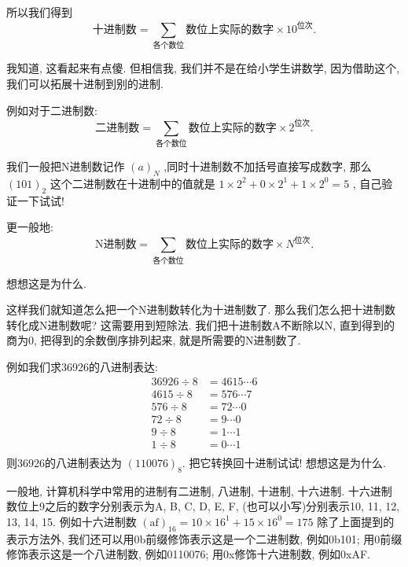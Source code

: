         所以我们得到
            \[ \mbox{十进制数} = \sum _ {\mbox{各个数位}} \mbox{数位上实际的数字} \times 10 ^ {\mbox{位次}}. \]
        
        我知道, 这看起来有点傻. 但相信我, 我们并不是在给小学生讲数学, 因为借助这个, 我们可以拓展十进制到别的进制. 

        例如对于二进制数:
            \[ \mbox{二进制数} = \sum _ {\mbox{各个数位}} \mbox{数位上实际的数字} \times 2 ^ {\mbox{位次}}. \]
        
        我们一般把N进制数记作 $ (a)_N $ ,同时十进制数不加括号直接写成数字, 那么 $ (101) _ 2 $ 这个二进制数在十进制中的值就是 $ 1 \times 2 ^ 2 + 0 \times 2 ^ 1 + 1 \times 2 ^ 0 = 5 $ , 自己验证一下试试! 

        更一般地:
            \begin{equation}
                \mbox{N进制数} = \sum _ {\mbox{各个数位}} \mbox{数位上实际的数字} \times N ^ {\mbox{位次}}. \label{进制转换公式}
            \end{equation}
        
        想想这是为什么.

        这样我们就知道怎么把一个N进制数转化为十进制数了. 那么我们怎么把十进制数转化成N进制数呢? 这需要用到短除法. 我们把十进制数A不断除以N, 直到得到的商为0, 把得到的余数倒序排列起来, 就是所需要的N进制数了.

        例如我们求36926的八进制表达:
        \begin{align*}
            36926 \div 8 &= 4615 \cdots 6 \\
            4615 \div 8 &= 576 \cdots 7 \\
            576 \div 8 &= 72 \cdots 0 \\
            72 \div 8 &= 9 \cdots 0 \\
            9 \div 8 &= 1 \cdots 1 \\
            1 \div 8 &= 0 \cdots 1 \\
        \end{align*}
        则36926的八进制表达为 $ (110076)_8 $. 把它转换回十进制试试! 想想这是为什么.

        一般地, 计算机科学中常用的进制有二进制, 八进制, 十进制, 十六进制. 十六进制数位上9之后的数字分别表示为A, B, C, D, E, F, (也可以小写)分别表示10, 11, 12, 13, 14, 15. 例如十六进制数 $ (\textrm{af})_16 = 10 \times 16 ^ 1 + 15 \times 16 ^ 0 = 175 $ 除了上面提到的表示方法外, 我们还可以用0b前缀修饰表示这是一个二进制数, 例如0b101; 用0前缀修饰表示这是一个八进制数, 例如0110076; 用0x修饰十六进制数, 例如0xAF.

